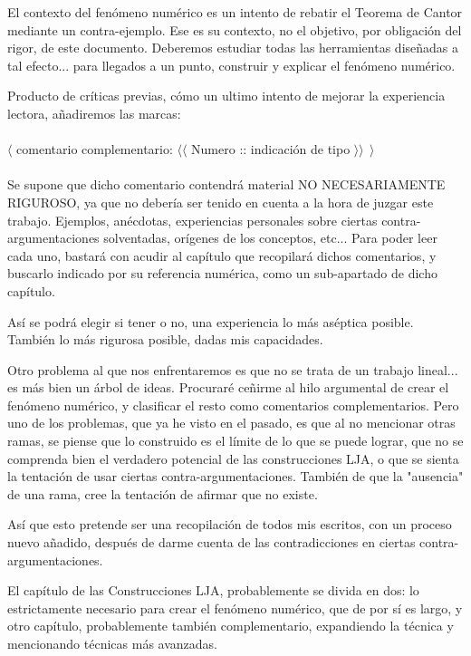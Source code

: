 El contexto del fenómeno numérico es un intento de rebatir el Teorema de Cantor mediante un contra-ejemplo. Ese es su contexto, no el objetivo, por obligación del rigor, de este documento. Deberemos estudiar todas las herramientas diseñadas a tal efecto... para llegados a un punto, construir y explicar el fenómeno numérico.

Producto de críticas previas, cómo un ultimo intento de mejorar la experiencia lectora, añadiremos las marcas:\\\\
\noindent $\langle$ comentario complementario: $\langle\langle$ Numero :: indicación de tipo $\rangle\rangle \:\: \rangle$  \\\\
\noindent Se supone que dicho comentario contendrá material NO NECESARIAMENTE RIGUROSO, ya que no debería ser tenido en cuenta a la hora de juzgar este trabajo. Ejemplos, anécdotas, experiencias personales sobre ciertas contra-argumentaciones solventadas, orígenes de los conceptos, etc... Para poder leer cada uno, bastará con acudir al capítulo que recopilará dichos comentarios, y buscarlo indicado por su referencia numérica, como un sub-apartado de dicho capítulo.

Así se podrá elegir si tener o no, una experiencia lo más aséptica posible. También lo más rigurosa posible, dadas mis capacidades.

Otro problema al que nos enfrentaremos es que no se trata de un trabajo lineal... es más bien un árbol de ideas. Procuraré ceñirme al hilo argumental de crear el fenómeno numérico, y clasificar el resto como comentarios complementarios. Pero uno de los problemas, que ya he visto en el pasado, es que al no mencionar otras ramas, se piense que lo construido es el límite de lo que se puede lograr, que no se comprenda bien el verdadero potencial de las construcciones LJA, o que se sienta la tentación de usar ciertas contra-argumentaciones. También de que la "ausencia" de una rama, cree la tentación de afirmar que no existe.

Así que esto pretende ser una recopilación de todos mis escritos, con un proceso nuevo añadido, después de darme cuenta de las contradicciones en ciertas contra-argumentaciones.

El capítulo de las Construcciones LJA, probablemente se divida en dos: lo estrictamente necesario para crear el fenómeno numérico, que de por sí es largo, y otro capítulo, probablemente también complementario, expandiendo la técnica y mencionando técnicas más avanzadas.

